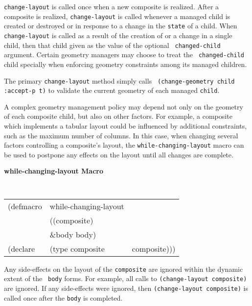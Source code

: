 \documentclass[twoside]{book}
\begin{document}
\begin{sloppy}
\begin{flushright}
{{\tt change-layout} is called once when a new composite is realized. After a
composite is realized, {\tt change-layout} is called whenever a managed child is
created or destroyed or in response to a change in the {\tt state} of a child.
When {\tt change-layout} is called as a result of the creation of or a change in
a single child, then that child given as the value of the optional {\tt
changed-child} argument. Certain geometry managers may choose to treat the {\tt
changed-child} child specially when enforcing geometry constraints among its
managed children.

The primary {\tt change-layout} method simply calls {\tt
(change-geometry child :accept-p t)} to validate the current geometry of each
managed {\tt child}.

}\end{flushright}


A complex geometry management policy may depend not only on the geometry
of each composite child, but also on other factors. For example, a
composite which implements a tabular layout could be influenced by
additional constraints, such as the maximum number of
columns\footnotemark{}.
In this case, when changing several factors controlling a composite's
layout, the {\tt while-changing-layout} macro can be used to postpone
any effects on the layout until all changes are complete.

{\samepage
{\large {\bf while-changing-layout \hfill Macro}} 
\begin{flushright} \parbox[t]{6.125in}{
\tt
\begin{tabular}{lll}
\raggedright
(defmacro & while-changing-layout & \\ 
& ((composite) \\
& \&body body) \\
(declare &(type composite & composite)))\\
\end{tabular}
\rm

}\end{flushright}}

\begin{flushright} \parbox[t]{6.125in}{ 
Any side-effects on the layout
of the {\tt composite} are ignored within the dynamic extent of the {\tt
body} forms. For example, all calls to {\tt (change-layout composite)}
are ignored. If any side-effects were ignored, then {\tt (change-layout
composite)} is called once after the {\tt body} is completed.

}
\end{flushright}
\end{sloppy}
\end{document}
